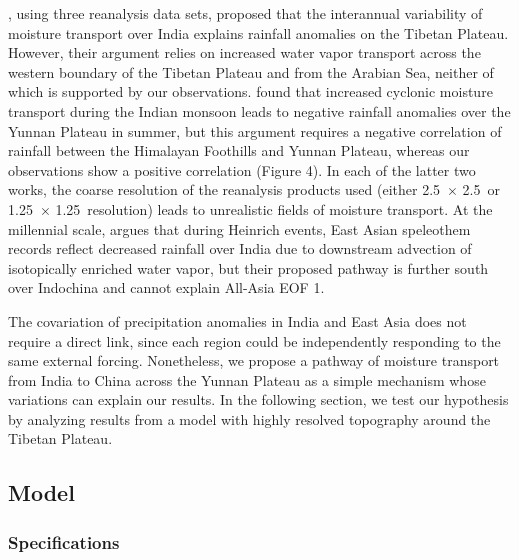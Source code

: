 \documentclass[12pt]{article}
\begin{document}
	\cite{Feng2012}, using three reanalysis data sets, proposed that the interannual variability of moisture transport over India explains rainfall anomalies on the Tibetan Plateau. However, their argument relies on increased water vapor transport across the western boundary of the Tibetan Plateau and from the Arabian Sea, neither of which is supported by our observations. \cite{Cao2014} found that increased cyclonic moisture transport during the Indian monsoon leads to negative rainfall anomalies over the Yunnan Plateau in summer, but this argument requires a negative correlation of rainfall between the Himalayan Foothills and Yunnan Plateau, whereas our observations show a positive correlation (Figure 4). In each of the latter two works, the coarse resolution of the reanalysis products used (either 2.5\textdegree\ $\times$ 2.5\textdegree\ or 1.25\textdegree\ $\times$ 1.25\textdegree\ resolution) leads to unrealistic fields of moisture transport. At the millennial scale, \cite{Pausata2011} argues that during Heinrich events, East Asian speleothem records reflect decreased rainfall over India due to downstream advection of isotopically enriched water vapor, but their proposed pathway is further south over Indochina and cannot explain All-Asia EOF 1.

	The covariation of precipitation anomalies in India and East Asia does not require a direct link, since each region could be independently responding to the same external forcing. Nonetheless, we propose a pathway of moisture transport from India to China across the Yunnan Plateau as a simple mechanism whose variations can explain our results.  In the following section, we test our hypothesis by analyzing results from a model with highly resolved topography around the Tibetan Plateau.

\subsection{Model}

\subsubsection{Specifications}
	
\end{document}
